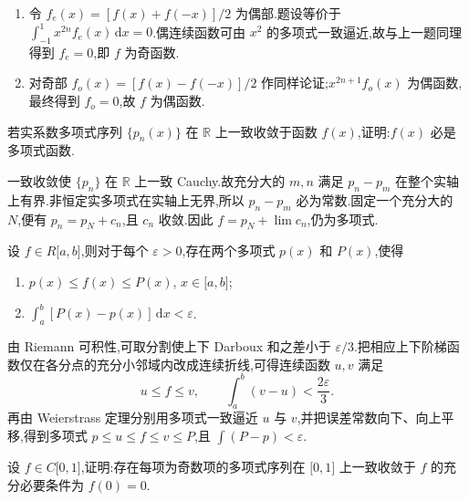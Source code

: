 \begin{solution}
    \begin{enumerate}
        \item 令 $f_e(x)=[f(x)+f(-x)]/2$ 为偶部.题设等价于
              $\int_{-1}^{1}x^{2n}f_e(x)\,\mathrm{d}x=0$.偶连续函数可由 $x^2$ 的多项式一致逼近,故与上一题同理得到 $f_e=0$,即 $f$ 为奇函数.
        \item 对奇部 $f_o(x)=[f(x)-f(-x)]/2$ 作同样论证;$x^{2n+1}f_o(x)$ 为偶函数,最终得到 $f_o=0$,故 $f$ 为偶函数.
    \end{enumerate}
\end{solution}

\begin{example}
    若实系数多项式序列 $\{p_n(x)\}$ 在 $\mathbb R$ 上一致收敛于函数 $f(x)$,证明:$f(x)$ 必是多项式函数.
\end{example}
\exampleblank

\begin{solution}
    一致收敛使 $\{p_n\}$ 在 $\mathbb R$ 上一致 Cauchy.故充分大的 $m,n$ 满足
    $p_n-p_m$ 在整个实轴上有界.非恒定实多项式在实轴上无界,所以
    $p_n-p_m$ 必为常数.固定一个充分大的 $N$,便有 $p_n=p_N+c_n$,且
    $c_n$ 收敛.因此 $f=p_N+\lim c_n$,仍为多项式.
\end{solution}

\begin{example}
    设 $f\in R\lbrack a,b\rbrack$,则对于每个 $\varepsilon>0$,存在两个多项式 $p(x)$ 和 $P(x)$,使得
    \begin{enumerate}
        \item $p(x)\leq f(x)\leq P(x)$, $x\in\lbrack a,b\rbrack$;
        \item $\displaystyle\int_a^b[P(x)-p(x)]\,\mathrm{d}x<\varepsilon$.
    \end{enumerate}
\end{example}
\exampleblank

\begin{solution}
    由 Riemann 可积性,可取分割使上下 Darboux 和之差小于 $\varepsilon/3$.把相应上下阶梯函数仅在各分点的充分小邻域内改成连续折线,可得连续函数 $u,v$ 满足
    \[
        u\leq f\leq v,\qquad \int_a^b(v-u)<\dfrac{2\varepsilon}{3}.
    \]
    再由 Weierstrass 定理分别用多项式一致逼近 $u$ 与 $v$,并把误差常数向下、向上平移,得到多项式 $p\leq u\leq f\leq v\leq P$,且
    $\int(P-p)<\varepsilon$.
\end{solution}

\begin{example}
    设 $f\in C\lbrack 0,1\rbrack$,证明:存在每项为奇数项的多项式序列在 $\lbrack 0,1\rbrack$ 上一致收敛于 $f$ 的充分必要条件为 $f(0)=0$.
\end{example}
\exampleblank

